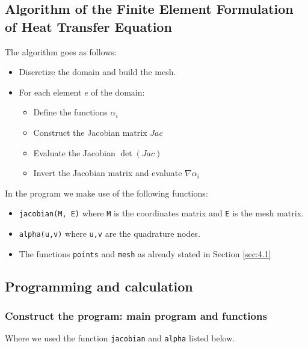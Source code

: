\subsection{Algorithm of the Finite Element Formulation of Heat Transfer Equation}
The algorithm goes as follows:
\begin{itemize}
	\item Discretize the domain and build the mesh.
	\item For each element $ e $ of the domain:
	\begin{itemize}
		\item Define the functions $ \alpha_i $
		\item Construct the Jacobian matrix $ Jac $
		\item Evaluate the Jacobian $ \det(Jac) $
		\item Invert the Jacobian matrix and evaluate $ \nabla \alpha_i $
	\end{itemize}
\end{itemize}

In the program we make use of the following functions:
\begin{itemize}
	\item \texttt{jacobian(M, E)} where \texttt{M} is the coordinates matrix and \texttt{E} is the mesh matrix.
	\item \texttt{alpha(u,v)} where \texttt{u,v} are the quadrature nodes.
	\item The functions \texttt{points} and \texttt{mesh} as already stated in Section \ref{sec:4.1} 
\end{itemize}



\subsection{Programming and calculation}
\subsubsection{Construct the program: main program and functions}


Where we used the function \texttt{jacobian} and \texttt{alpha} listed below.




 




